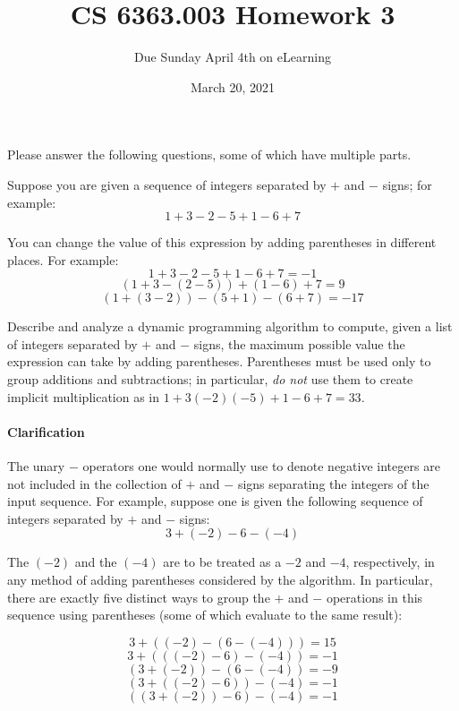 \documentclass[11pt]{article}
\begin{document}
\title{CS 6363.003 Homework 3}
\author{Due Sunday April 4th on eLearning}
\date{March 20, 2021}

\maketitle

Please answer the following  questions, some of which have multiple parts.


\begin{problems}
\item
  Suppose you are given a sequence of integers separated by \(+\) and \(-\) signs;
  for example:
  \[ 1 + 3 - 2 - 5 + 1 - 6 + 7 \]

  You can change the value of this expression by adding parentheses in different places.
  For example:
  \[ 1 + 3 - 2 - 5 + 1 - 6 + 7 = -1 \]
  \[ (1 + 3 - (2 - 5)) + (1 - 6) + 7 = 9 \]
  \[ (1 + (3 - 2)) - (5 + 1) - (6 + 7) = -17 \]

  Describe and analyze a dynamic programming algorithm to compute, given a list of integers
  separated by \(+\) and \(-\) signs, the maximum possible value the expression can take by adding
  parentheses.
  Parentheses must be used only to group additions and subtractions;
  in particular, \emph{do not} use them to create implicit multiplication as in \(1 + 3(-2)(-5) + 1
  - 6 + 7 = 33\).
  
  \paragraph*{Clarification} 
  The unary \(-\) operators one would normally use to denote negative integers are not included in
  the collection of \(+\) and \(-\) signs separating the integers of the input sequence.
  For example, suppose one is given the following sequence of integers separated by \(+\) and \(-\)
  signs:
  \[ 3 + (-2) - 6 - (-4)  \]

  The \((-2)\) and the \((-4)\) are to be treated as a \(-2\) and \(-4\), respectively, in any
  method of adding parentheses considered by the algorithm.
  In particular, there are exactly five distinct ways to group the \(+\) and \(-\) operations in
  this sequence using parentheses (some of which evaluate to the same result):
  
  \[ 3 + ((-2) - (6 - (-4))) = 15 \]
  \[ 3 + (((-2) - 6) - (-4)) = -1 \]
  \[ (3 + (-2)) - (6 - (-4)) = -9 \]
  \[ (3 + ((-2) - 6)) - (-4) = -1 \]
  \[ ((3 + (-2)) - 6) - (-4) = -1 \]


\end{problems}
\end{document}
